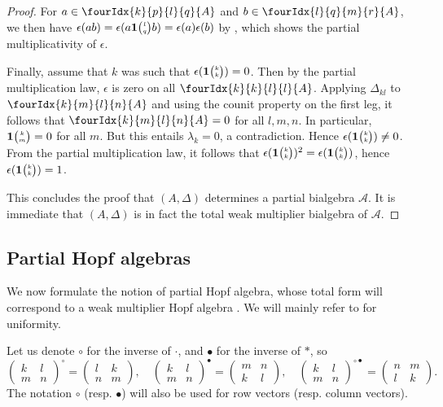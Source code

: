 \documentclass[10pt]{article}
\newcommand{\Grt}[3]{#1{\tiny {\begin{pmatrix} #2\\#3\end{pmatrix}}}}
\newcommand{\UnitC}[2]{\Grt{\mathbf{1}}{#1}{#2}}
\newcommand{\Gr}[5]{\fourIdx{#2}{#4}{#3}{#5}{#1}}%
\newcommand{\wmult}{\cdot}
\newcommand{\bmult}{*}
\theoremstyle{definition}
\numberwithin{equation}{section}
\begin{document}
\begin{proof}
For $a\in \Gr{A}{k}{l}{p}{q}$ and $b\in \Gr{A}{l}{m}{q}{r}$, we then have $\epsilon(ab) = \epsilon(a\UnitC{l}{q}b) = \epsilon(a)\epsilon(b)$ by \cite[Proposition 2.6.(4)]{Boh1}, which shows the partial multiplicativity of $\epsilon$. 

Finally, assume that $k$ was such that $\epsilon(\UnitC{k}{k})=0$. Then by the partial multiplication law, $\epsilon$ is zero on all $\Gr{A}{k}{l}{k}{l}$. Applying $\Delta_{kl}$ to $\Gr{A}{k}{l}{m}{n}$ and using the counit property on the first leg, it follows that $\Gr{A}{k}{l}{m}{n}=0$ for all $l,m,n$. In particular, $\UnitC{k}{m}=0$ for all $m$. But this entails $\lambda_k=0$, a contradiction. Hence $\epsilon(\UnitC{k}{k})\neq 0$. From the partial multiplication law, it follows that $\epsilon(\UnitC{k}{k})^2 = \epsilon(\UnitC{k}{k})$, hence $\epsilon(\UnitC{k}{k})=1$.

This concludes the proof that $(A,\Delta)$ determines a partial bialgebra $\mathscr{A}$. It is immediate that $(A,\Delta)$ is in fact the total weak multiplier bialgebra of $\mathscr{A}$. 
\end{proof} 


\subsection{Partial Hopf algebras}

We now formulate the notion of partial Hopf algebra, whose total form will correspond to a weak multiplier Hopf algebra \cite{Boh1,VDW2,VDW1}. We will mainly refer to \cite{Boh1} for uniformity.

 Let us denote $\circ$ for the inverse of $\wmult$, and $\bullet$ for the inverse of $\bmult$, so \[\begin{pmatrix} k & l \\ m & n \end{pmatrix}^{\circ} = \begin{pmatrix} l & k \\ n & m \end{pmatrix},\quad \begin{pmatrix} k & l \\ m & n \end{pmatrix}^{\bullet} = \begin{pmatrix} m & n \\ k & l \end{pmatrix},\quad \begin{pmatrix} k & l \\ m & n \end{pmatrix}^{\circ \bullet} = \begin{pmatrix} n & m \\ l & k \end{pmatrix}.\] The notation $\circ$ (resp. $\bullet$) will also be used for row vectors (resp. column vectors).
\end{document}
